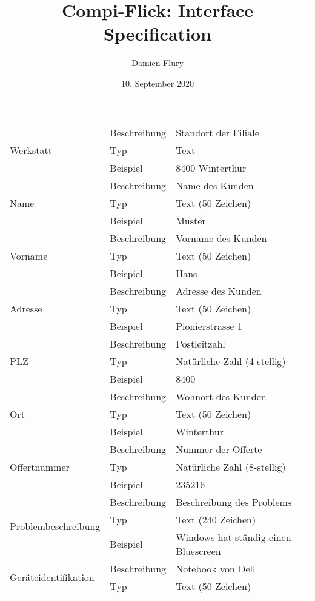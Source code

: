 \documentclass[a4paper]{scrartcl}
\title{Compi-Flick: Interface Specification}
\author{Damien Flury}
\date{10. September 2020}
\begin{document}
  \maketitle

  \begin{tabularx}{\textwidth}{ll X}
    \hline
    \multirow{3}{*}{Werkstatt} & Beschreibung & Standort der Filiale \\
    & Typ & Text \\
    & Beispiel & 8400 Winterthur \\ 
    \hline
    \multirow{3}{*}{Name} & Beschreibung & Name des Kunden \\
    & Typ & Text (50 Zeichen) \\
    & Beispiel & Muster \\
    \hline
    \multirow{3}{*}{Vorname} & Beschreibung & Vorname des Kunden \\
    & Typ & Text (50 Zeichen) \\
    & Beispiel & Hans \\
    \hline
    \multirow{3}{*}{Adresse} & Beschreibung & Adresse des Kunden \\
    & Typ & Text (50 Zeichen) \\
    & Beispiel & Pionierstrasse 1 \\
    \hline
    \multirow{3}{*}{PLZ} & Beschreibung & Postleitzahl \\
    & Typ & Natürliche Zahl (4-stellig) \\
    & Beispiel & 8400 \\
    \hline
    \multirow{3}{*}{Ort} & Beschreibung & Wohnort des Kunden \\
    & Typ & Text (50 Zeichen) \\
    & Beispiel & Winterthur \\
    \hline
    \multirow{3}{*}{Offertnummer} & Beschreibung & Nummer der Offerte \\
    & Typ & Natürliche Zahl (8-stellig) \\
    & Beispiel & 235216 \\
    \hline
    \multirow{3}{*}{Problembeschreibung} & Beschreibung & Beschreibung des Problems \\
    & Typ & Text (240 Zeichen) \\
    & Beispiel & Windows hat ständig einen Bluescreen \\
    \hline
    \multirow{3}{*}{Geräteidentifikation} & Beschreibung & Notebook von Dell \\ 
    & Typ & Text (50 Zeichen) \\

\end{tabularx}
\end{document}
